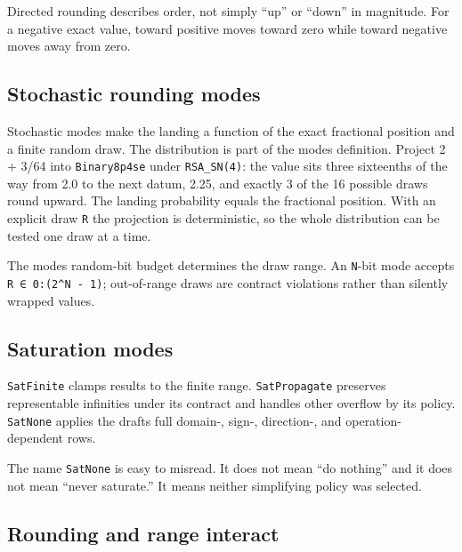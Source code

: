 Directed rounding describes order, not simply “up” or “down” in magnitude. For a negative exact value, toward positive moves toward zero while toward negative moves away from zero.



\subsection{Stochastic rounding modes}



\label{12929662523993820329}{}


Stochastic modes make the landing a function of the exact fractional position and a finite random draw. The distribution is part of the mode{\textquotesingle}s definition. Project 2 + 3/64 into \texttt{Binary8p4se} under \texttt{RSA\_\allowbreak{}SN(4)}: the value sits three sixteenths of the way from 2.0 to the next datum, 2.25, and exactly 3 of the 16 possible draws round upward. The landing probability equals the fractional position. With an explicit draw \texttt{R} the projection is deterministic, so the whole distribution can be tested one draw at a time.



The mode{\textquotesingle}s random-bit budget determines the draw range. An \texttt{N}-bit mode accepts \texttt{R ∈ 0:(2{\textasciicircum}N - 1)}; out-of-range draws are contract violations rather than silently wrapped values.



\subsection{Saturation modes}



\label{831276013764003172}{}


\texttt{SatFinite} clamps results to the finite range. \texttt{SatPropagate} preserves representable infinities under its contract and handles other overflow by its policy. \texttt{SatNone} applies the draft{\textquotesingle}s full domain-, sign-, direction-, and operation-dependent rows.



The name \texttt{SatNone} is easy to misread. It does not mean “do nothing” and it does not mean “never saturate.” It means neither simplifying policy was selected.



\subsection{Rounding and range interact}



